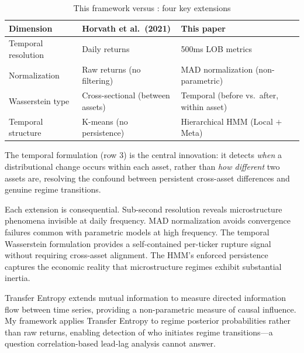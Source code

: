 \documentclass{article}
\begin{document}
\begin{table}[H]
\centering
\begin{threeparttable}
\caption{This framework versus \textcite{horvath2021clustering}: four key extensions}
\label{tab:lit_comparison}
\begin{tabular}{lll}
\toprule
\textbf{Dimension} & \textbf{Horvath et al.\ (2021)} & \textbf{This paper} \\
\midrule
Temporal resolution  & Daily returns                        & 500ms LOB metrics \\
Normalization        & Raw returns (no filtering)           & MAD normalization (non-parametric) \\
Wasserstein type     & Cross-sectional (between assets)     & Temporal (before vs.\ after, within asset) \\
Temporal structure   & K-means (no persistence)             & Hierarchical HMM (Local $+$ Meta) \\
\bottomrule
\end{tabular}
\begin{tablenotes}\small
\item The temporal formulation (row 3) is the central innovation: it detects \textit{when} a distributional change occurs within each asset, rather than \textit{how different} two assets are, resolving the confound between persistent cross-asset differences and genuine regime transitions.
\end{tablenotes}
\end{threeparttable}
\end{table}

Each extension is consequential. Sub-second resolution reveals microstructure
phenomena invisible at daily frequency. MAD normalization avoids convergence
failures common with parametric models at high frequency. The temporal
Wasserstein formulation provides a self-contained per-ticker rupture signal
without requiring cross-asset alignment. The HMM's enforced persistence captures
the economic reality that microstructure regimes exhibit substantial inertia.

Transfer Entropy \parencite{schreiber2000measuring} extends mutual information to
measure directed information flow between time series, providing a
non-parametric measure of causal influence. My framework applies Transfer
Entropy to regime posterior probabilities rather than raw returns, enabling
detection of who initiates regime transitions---a question correlation-based
lead-lag analysis cannot answer.
\end{document}
